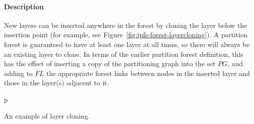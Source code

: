 \paragraph{Description}

New layers can be inserted anywhere in the forest by cloning the layer below the insertion point (for example, see Figure~\ref{fig:ipfs-forest-layercloning}). A partition forest is guaranteed to have at least one layer at all times, so there will always be an existing layer to clone. In terms of the earlier partition forest definition, this has the effect of inserting a copy of the partitioning graph into the set $\textit{PG}$, and adding to $\textit{FL}$ the appropriate forest links between nodes in the inserted layer and those in the layer(s) adjacent to it.

\begin{stusubfig}{p}
	\\
\caption{An example of layer cloning.}
\label{fig:ipfs-forest-layercloning}
\end{stusubfig}

